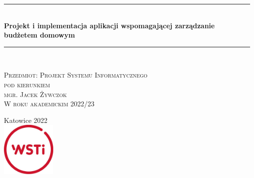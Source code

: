 \documentclass[a4paper, 10pt, twoside, openright]{report}
\newcommand{\customstyletitle}[1]{\Huge{\textbf{#1}}}
\newcommand{\HRule}{\rule{\linewidth}{0.5mm}} %
\begin{document}
\begin{large}
\begin{titlepage}
	\begin{center}
    \HRule\\[0.4cm]
	{\customstyletitle{Projekt i implementacja aplikacji wspomagającej zarządzanie budżetem domowym}}\\[0.4cm] 
    \HRule\\[1.5cm]
    \end{center}
	
	\begin{flushright}
        \textsc{Przedmiot: Projekt Systemu Informatycznego}\\[0cm]
        \textsc{pod kierunkiem}\\[0cm]
        \textsc{mgr. Jacek Żywczok}\\[0cm]
        \textsc{W roku akademickim 2022/23}\\[0cm]
    \end{flushright}
 
	\vfill                  %
	\begin{center}
    {Katowice 2022}\\	    %
	\includegraphics[width=0.2\textwidth]{figures/WSTI-logo.jpg}\\[1cm]
	\end{center}
\end{titlepage}

\renewcommand*\contentsname{Spis treści}
\tableofcontents                    %




\end{large}
\end{document}
